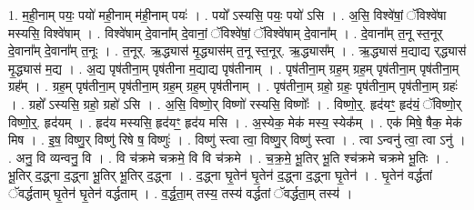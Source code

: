 \documentclass[17pt]{extarticle}
\begin{document}
1. म॒ही॒नाम् पयः॒ पयो॑ मही॒नाम् म॑ही॒नाम् पयः॑ । . पयो᳚ ऽस्यसि॒ पयः॒ पयो॑ ऽसि । . अ॒सि॒ विश्वे॑षां॒ ॅविश्वे॑षा मस्यसि॒ विश्वे॑षाम् । . विश्वे॑षाम् दे॒वाना᳚म् दे॒वानां॒ ॅविश्वे॑षां॒ ॅविश्वे॑षाम् दे॒वाना᳚म् । . दे॒वाना᳚म् त॒नू स्त॒नूर् दे॒वाना᳚म् दे॒वाना᳚म् त॒नूः । . त॒नूर्. ऋ॒द्ध्यास॑ मृ॒द्ध्यास॑म् त॒नू स्त॒नूर्. ऋ॒द्ध्यास᳚म् । . ऋ॒द्ध्यास॑ म॒द्याद्य र्‌द्ध्यास॑ मृ॒द्ध्यास॑ म॒द्य । . अ॒द्य पृष॑तीना॒म् पृष॑तीना म॒द्याद्य पृष॑तीनाम् । . पृष॑तीना॒म् ग्रह॒म् ग्रह॒म् पृष॑तीना॒म् पृष॑तीना॒म् ग्रह᳚म् । . ग्रह॒म् पृष॑तीना॒म् पृष॑तीना॒म् ग्रह॒म् ग्रह॒म् पृष॑तीनाम् । . पृष॑तीना॒म् ग्रहो॒ ग्रहः॒ पृष॑तीना॒म् पृष॑तीना॒म् ग्रहः॑ । . ग्रहो᳚ ऽस्यसि॒ ग्रहो॒ ग्रहो॑ ऽसि । . अ॒सि॒ विष्णो॒र् विष्णो॑ रस्यसि॒ विष्णोः᳚ । . विष्णो॒र्॒. हृद॑यꣳ॒॒ हृद॑यं॒ ॅविष्णो॒र् विष्णो॒र्॒. हृद॑यम् । . हृद॑य मस्यसि॒ हृद॑यꣳ॒॒ हृद॑य मसि । . अ॒स्येक॒ मेक॑ मस्य॒ स्येक᳚म् । . एक॑ मिषे॒ षैक॒ मेक॑ मिष । . इ॒ष॒ विष्णु॒र् विष्णु॑ रिषे ष॒ विष्णुः॑ । . विष्णु॑ स्त्वा त्वा॒ विष्णु॒र् विष्णु॑ स्त्वा । . त्वा ऽन्वनु॑ त्वा॒ त्वा ऽनु॑ । . अनु॒ वि व्यन्वनु॒ वि । . वि च॑क्रमे चक्रमे॒ वि वि च॑क्रमे । . च॒क्र॒मे॒ भू॒तिर् भू॒ति श्च॑क्रमे चक्रमे भू॒तिः । . भू॒तिर् द॒द्ध्ना द॒द्ध्ना भू॒तिर् भू॒तिर् द॒द्ध्ना । . द॒द्ध्ना घृ॒तेन॑ घृ॒तेन॑ द॒द्ध्ना द॒द्ध्ना घृ॒तेन॑ । . घृ॒तेन॑ वर्द्धतां ॅवर्द्धताम् घृ॒तेन॑ घृ॒तेन॑ वर्द्धताम् । . व॒र्द्ध॒ता॒म् तस्य॒ तस्य॑ वर्द्धतां ॅवर्द्धता॒म् तस्य॑ । \newline
\end{document}
